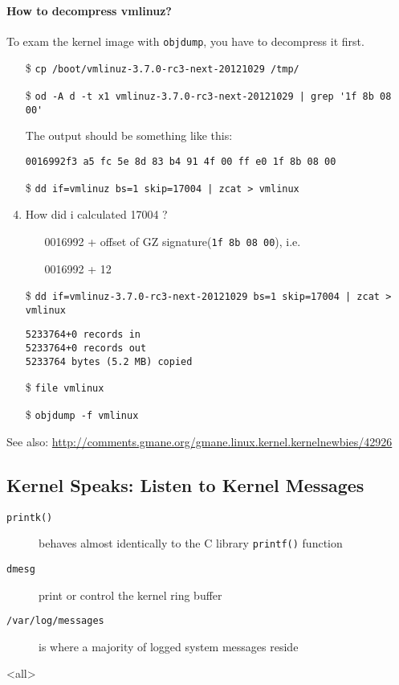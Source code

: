\paragraph{How to decompress vmlinuz?}

To exam the kernel image with \texttt{objdump}, you have to decompress it first.
\begin{enumerate}
\item[\$] \verb|cp /boot/vmlinuz-3.7.0-rc3-next-20121029 /tmp/|
\item[\$] \verb^od -A d -t x1 vmlinuz-3.7.0-rc3-next-20121029 | grep '1f 8b 08 00'^

  The output should be something like this:
  \begin{center}
    \texttt{0016992}\qquad\texttt{f3 a5 fc 5e 8d 83 b4 91 4f 00 ff e0 1f 8b 08 00}
  \end{center}
\item[\$] \verb^dd if=vmlinuz bs=1 skip=17004 | zcat > vmlinux^
\item How did i calculated 17004 ?
  \begin{itemize}
  \item[] 0016992 + offset of GZ signature(\texttt{1f 8b 08 00}), i.e.
  \item[] 0016992 + 12
  \end{itemize}
\item[\$] \verb^dd if=vmlinuz-3.7.0-rc3-next-20121029 bs=1 skip=17004 | zcat > vmlinux^
\begin{verbatim}
5233764+0 records in
5233764+0 records out
5233764 bytes (5.2 MB) copied
\end{verbatim}
\item[\$] \verb|file vmlinux|
\item[\$] \verb|objdump -f vmlinux|
\end{enumerate}

See also: \url{http://comments.gmane.org/gmane.linux.kernel.kernelnewbies/42926}

\subsection{Kernel Speaks: Listen to Kernel Messages}

\begin{frame}
  \begin{description}
  \item[\texttt{printk()}] behaves almost identically to the C library \texttt{printf()} function
  \item[\texttt{dmesg}] print or control the kernel ring buffer
  \item[\texttt{/var/log/messages}] is where a majority of logged system messages reside
  \end{description}
\end{frame}



\mode<all>

